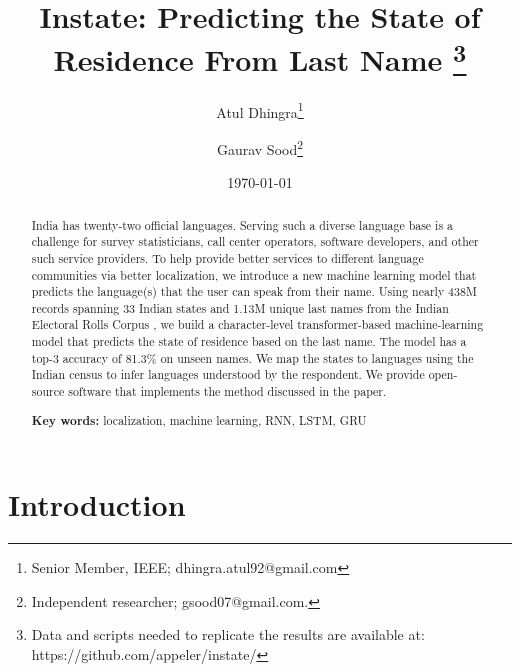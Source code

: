 \documentclass[11pt,  letterpaper]{article}
\title{Instate: Predicting the State of Residence From Last Name
\thanks{Data and scripts needed to replicate the results are available at: https://github.com/appeler/instate/}}
\author{Atul Dhingra\thanks{Senior Member, IEEE; \textsf{dhingra.atul92@gmail.com}} \and Gaurav Sood\thanks{Independent researcher;  \textsf{gsood07@gmail.com}.}}
\date{\today}
\begin{document}
\maketitle

\begin{abstract}

India has twenty-two official languages. Serving such a diverse language base is a challenge for survey statisticians, call center operators, software developers, and other such service providers. To help provide better services to different language communities via better localization, we introduce a new machine learning model that predicts the language(s) that the user can speak from their name. Using nearly 438M records spanning 33 Indian states and 1.13M unique last names from the Indian Electoral Rolls Corpus \citep{DVN/OG47IV_2023}, we build a character-level transformer-based machine-learning model that predicts the state of residence based on the last name. The model has a top-3 accuracy of 81.3\% on unseen names. We map the states to languages using the Indian census to infer languages understood by the respondent. We provide open-source software that implements the method discussed in the paper.

\smallskip

\textbf{Key words:} localization, machine learning, RNN, LSTM, GRU

\end{abstract}




\section{Introduction}
\end{document}
